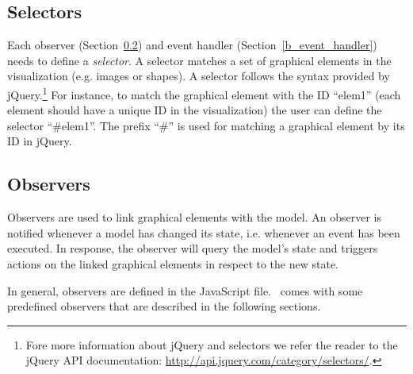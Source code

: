 %
%

\subsection{Selectors}
\label{selectors}

Each observer (Section~\ref{b_observers}) and event handler (Section~\ref{b_event_handler}) needs to define a \textit{selector}.
A selector matches a set of graphical elements in the visualization (e.g. images or shapes). 
A selector follows the syntax provided by jQuery.\footnote{Fore more information about jQuery and selectors we refer the reader to the jQuery API documentation: \url{http://api.jquery.com/category/selectors/}.}
For instance, to match the graphical element with the ID ``elem1'' (each element should have a unique ID in the visualization) the user can define the selector ``\#elem1''.
The prefix ``\#'' is used for matching a graphical element by its ID in jQuery.

\subsection{Observers}
\label{b_observers}

Observers are used to link graphical elements with the model. 
An observer is notified whenever a model has changed its state, i.e. whenever an event has been executed. 
In response, the observer will query the model's state and triggers actions on the linked graphical elements in respect to the new state. 

In general, observers are defined in the JavaScript file. 
\bms~comes with some predefined observers that are described in the following sections.

